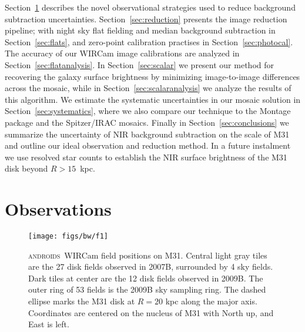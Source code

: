 \documentclass[iop,tighten]{emulateapj}
\newcommand{\androids}{\textsc{androids}}
\begin{document}
Section~\ref{sec:Observations} describes the novel observational strategies used to reduce background subtraction uncertainties.
Section~\ref{sec:reduction} presents the image reduction pipeline; with night sky flat fielding and median background subtraction in Section~\ref{sec:flats}, and zero-point calibration practises in Section~\ref{sec:photocal}.
The accuracy of our WIRCam image calibrations are analyzed in Section~\ref{sec:flatanalysis}.
In Section~\ref{sec:scalar} we present our method for recovering the galaxy surface brightness by minimizing image-to-image differences across the mosaic, while in Section~\ref{sec:scalaranalysis} we analyze the results of this algorithm.
We estimate the systematic uncertainties in our mosaic solution in Section~\ref{sec:systematics}, where we also compare our technique to the Montage package \citep{Berriman:2008} and the Spitzer/IRAC mosaics.
Finally in Section~\ref{sec:conclusions} we summarize the uncertainty of NIR background subtraction on the scale of M31 and outline our ideal observation and reduction method.
In a future instalment we use resolved star counts to establish the NIR surface brightness of the M31 disk beyond $R > 15$~kpc.

\section{Observations}
\label{sec:Observations}

\begin{figure}[t]
\centering
\texttt{[image: figs/bw/f1]}
\caption{\androids\ WIRCam field positions on M31.
Central light gray tiles are the 27 disk fields observed in 2007B, surrounded by 4 sky fields.
Dark tiles at center are the 12 disk fields observed in 2009B.
The outer ring of 53 fields is the 2009B sky sampling ring.
The dashed ellipse marks the M31 disk at $R=20$ kpc along the major axis.
Coordinates are centered on the nucleus of M31 with North up, and East is left.}
\label{fig:fieldmap}
\end{figure}

\end{document}
